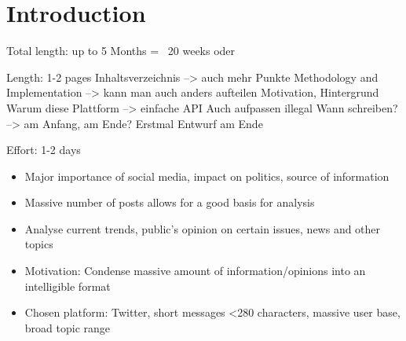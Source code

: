 \chapter{Introduction}
\label{cha:Chapter1_Introduction}

Total length: up to 5 Months = ~20 weeks oder

Length: 1-2 pages
Inhaltsverzeichnis --> auch mehr Punkte
Methodology and Implementation --> kann man auch anders aufteilen
Motivation, Hintergrund
Warum diese Plattform --> einfache API
Auch aufpassen illegal
Wann schreiben? --> am Anfang, am Ende? Erstmal Entwurf am Ende

Effort: 1-2 days
\begin{itemize}
\item Major importance of social media, impact on politics, source of information
\item Massive number of posts allows for a good basis for analysis
\item Analyse current trends, public's opinion on certain issues, news and other topics
\item Motivation: Condense massive amount of information/opinions into an intelligible format
\item Chosen platform: Twitter, short messages <280 characters, massive user base, broad topic range
\end{itemize}

